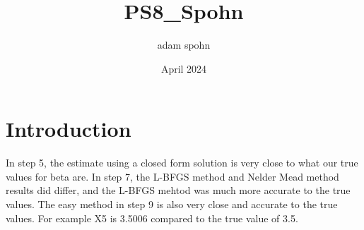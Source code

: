\documentclass{article}
\title{PS8_Spohn}
\author{adam spohn}
\date{April 2024}
\begin{document}
\maketitle

\section{Introduction}

In step 5, the estimate using a closed form solution is very close to what our true values for beta are. 
In step 7, the L-BFGS method and Nelder Mead method results did differ, and the L-BFGS mehtod was much more accurate to the true values.
The easy method in step 9 is also very close and accurate to the true values. For example X5 is 3.5006 compared to the true value of 3.5.



\end{document}
